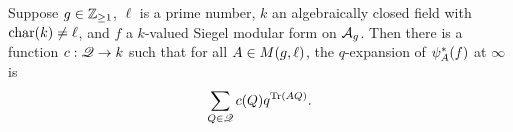 \documentclass{amsart}
\begin{document}
\begin{proposition}\label{prop:q-expansion}
  Suppose  $g \in \mathbb{Z}_{\ge 1}$, $\ell$ is a prime number,
  $k$ an algebraically closed field with $\operatorname{char}(k) \neq \ell$, %
  and $f$ a $k$-valued Siegel modular form on $\mathcal{A}_g$.
  Then there is a function  $c : \mathscr{Q} \to k$ such that for all %
  $A \in M(g,\ell)$, the $q$-expansion of
  $\psi_{A}^*(f)$ at $\infty$ is
  \begin{equation}
    \sum_{Q \in \mathscr{Q}} c(Q) q^{\operatorname{Tr}(AQ)}.\label{eq:q}
  \end{equation}
\end{proposition}
\end{document}
